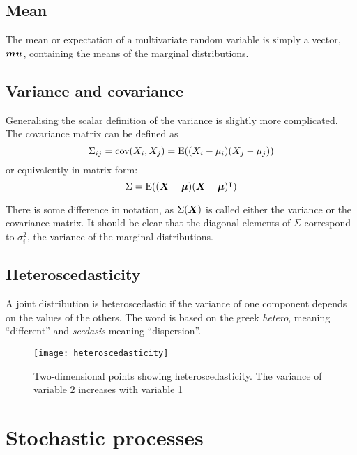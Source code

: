 \subsection{Mean}
The mean or expectation of a multivariate random variable is simply a vector, $\boldsymbol{mu}$, containing the means of the marginal distributions.

\subsection{Variance and covariance}
Generalising the scalar definition of the variance is slightly more complicated.
The covariance matrix can be defined as 
\begin{equation}
  \label{eq:covariance}
  \Sigma_{ij} = \textrm{cov}(X_i, X_j) = \mathrm{E}((X_i-\mu_i)(X_j-\mu_j))
\end{equation}
or equivalently in matrix form:
\begin{equation}
  \label{eq:matrixcovariance}
  \Sigma = \mathrm{E}((\boldsymbol{X} - \boldsymbol{\mu})(\boldsymbol{X}-\boldsymbol{\mu}){^\intercal})
\end{equation}

There is some difference in notation, as $\Sigma(\boldsymbol{X})$ is called either the variance or the covariance matrix.
It should be clear that the diagonal elements of $\Sigma$ correspond to $\sigma_i^2$, the variance of the marginal distributions.

\subsection{Heteroscedasticity}
A joint distribution is heteroscedastic if the variance of one component depends on the values of the others.  The word is based on the greek \emph{hetero}, meaning ``different'' and \emph{scedasis} meaning ``dispersion''.

\begin{figure}[htbp]
  \centering
  \texttt{[image: heteroscedasticity]}
  \caption[Two-dimensional points showing heteroscedasticity]{Two-dimensional points showing heteroscedasticity.  The variance of variable 2 increases with variable 1}
  \label{fig:heteroscedasticity}
\end{figure}


\section{Stochastic processes}
\label{sec:stochastic-processes}
